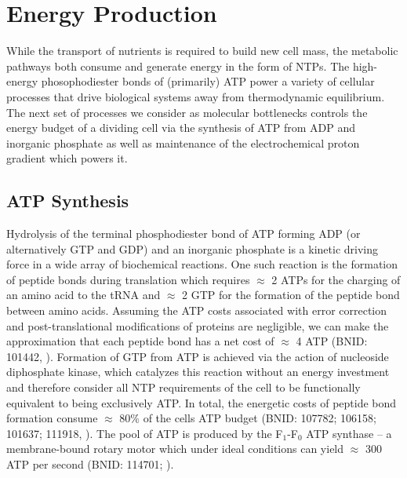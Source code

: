 \section{Energy Production}
While the transport of nutrients is required to build new cell mass, the
metabolic pathways both consume and generate energy in the form of NTPs. The
high-energy phosophodiester bonds of (primarily) ATP power a variety of
cellular processes that drive biological systems away from thermodynamic
equilibrium. The next set of processes we consider as molecular bottlenecks
controls the energy budget of a dividing cell via the synthesis of ATP from
ADP and inorganic phosphate as well as maintenance of the electrochemical
proton gradient which powers it.

\subsection{ATP Synthesis}

Hydrolysis of the terminal phosphodiester bond of ATP forming ADP (or
alternatively GTP and GDP) and an inorganic phosphate is a kinetic driving
force in a wide array of biochemical reactions. One such reaction is the
formation of peptide bonds during translation which requires $\approx$ 2 ATPs
for the charging of an amino acid to the tRNA and $\approx$ 2 GTP for the
formation of the peptide bond between amino acids. Assuming the ATP costs
associated with error correction and post-translational modifications of
proteins are negligible, we can make the approximation that each peptide bond
has a net cost of $\approx$ 4 ATP (BNID: 101442, \cite{milo2010}). Formation
of GTP from ATP is achieved via the action of nucleoside diphosphate kinase,
which catalyzes this reaction without an energy investment \citep{lascu2000}
and therefore consider all NTP requirements of the cell to be functionally
equivalent to being exclusively ATP. In total, the energetic costs of peptide
bond formation consume $\approx$ 80\% of the cells ATP budget (BNID: 107782;
106158; 101637; 111918, \cite{lynch2015,stouthamer1973}). The pool of ATP is
produced by the F$_1$-F$_0$ ATP synthase -- a membrane-bound rotary motor
which under ideal conditions can yield $\approx$ 300 ATP per second (BNID:
114701; \cite{weber2003}).

